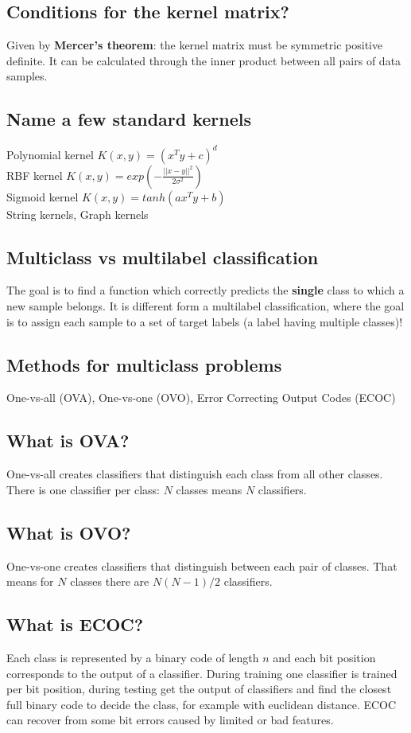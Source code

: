 \documentclass[12pt]{scrartcl}
\begin{document}
\subsection{Conditions for the kernel matrix?}
Given by {\bf Mercer's theorem}: the kernel matrix must be symmetric positive definite. It can be calculated through the inner product between all pairs of data samples.

\subsection{Name a few standard kernels}
Polynomial kernel $K(x,y)=(x^Ty+c)^d$ \\
RBF kernel $K(x,y) = exp(-\frac{||x-y||^2}{2\sigma^2})$ \\
Sigmoid kernel $K(x,y) = tanh(ax^Ty +b)$ \\
String kernels, Graph kernels

\subsection{Multiclass vs multilabel classification}
The goal is to find a function which correctly predicts the {\bf single} class to which a new sample belongs. It is different form a multilabel classification, where the goal is to assign each sample to a set of target labels (a label having multiple classes)!

\subsection{Methods for multiclass problems}
One-vs-all (OVA), One-vs-one (OVO), Error Correcting Output Codes (ECOC)

\subsection{What is OVA?}
One-vs-all creates classifiers that distinguish each class from all other classes. There is one classifier per class: $N$ classes means $N$ classifiers.

\subsection{What is OVO?}
One-vs-one creates classifiers that distinguish between each pair of classes. That means for $N$ classes there are $N(N-1)/2$ classifiers.

\subsection{What is ECOC?}
Each class is represented by a binary code of length $n$ and each bit position corresponds to the output of a classifier. During training one classifier is trained per bit position, during testing get the output of classifiers and find the closest full binary code to decide the class, for example with euclidean distance. ECOC can recover from some bit errors caused by limited or bad features.
\end{document}
